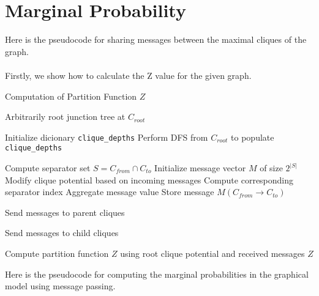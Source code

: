 \documentclass{article}
\begin{document}
\clearpage
\section{Marginal Probability}
Here is the pseudocode for sharing messages between the maximal cliques of the graph.\\~\\Firstly, we show how to calculate the Z value for the given graph.

\begin{algorithm}
    \caption{Computation of Partition Function \( Z \)}
    \begin{algorithmic}[1]


    
    \State Arbitrarily root junction tree at \( C_{root} \)

    \State Initialize dicionary \texttt{clique\_depths}
    \State Perform DFS from \( C_{root} \) to populate \texttt{clique\_depths}
    
        \State Compute separator set \( S = C_{from} \cap C_{to} \)
        \State Initialize message vector \( M \) of size \( 2^{|S|} \)
        \State Modify clique potential based on incoming messages
            \State Compute corresponding separator index
            \State Aggregate message value
        \EndFor
        \State Store message \( M(C_{from} \to C_{to}) \)
    \EndFunction
    
    
        \State Send messages to parent cliques
    \EndFor
    
        \State Send messages to child cliques
    \EndFor
    
    \State Compute partition function \( Z \) using root clique potential and received messages
    \State \Return \( Z \)
    
    \end{algorithmic}
\end{algorithm}

Here is the pseudocode for computing the marginal probabilities in the graphical model using message passing.
\end{document}
